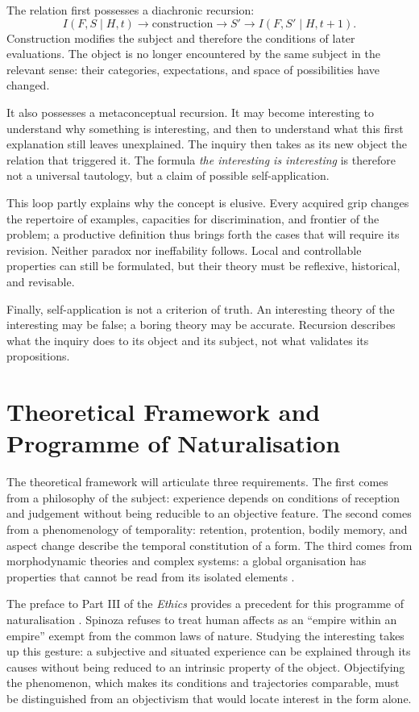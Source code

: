 \documentclass[11pt,a4paper]{article}
\begin{document}
The relation first possesses a diachronic recursion:
\[
  I(F,S\mid H,t)\longrightarrow
  \text{construction}\longrightarrow S'
  \longrightarrow I(F,S'\mid H,t+1).
\]
Construction modifies the subject and therefore the conditions of later
evaluations. The object is no longer encountered by the same subject in the
relevant sense: their categories, expectations, and space of possibilities
have changed.

It also possesses a metaconceptual recursion. It may become interesting to
understand why something is interesting, and then to understand what this first
explanation still leaves unexplained. The inquiry then takes as its new object
the relation that triggered it. The formula \emph{the interesting is
interesting} is therefore not a universal tautology, but a claim of possible
self-application.

This loop partly explains why the concept is elusive. Every acquired grip
changes the repertoire of examples, capacities for discrimination, and frontier
of the problem; a productive definition thus brings forth the cases that will
require its revision. Neither paradox nor ineffability follows. Local and
controllable properties can still be formulated, but their theory must be
reflexive, historical, and revisable.

Finally, self-application is not a criterion of truth. An interesting theory of
the interesting may be false; a boring theory may be accurate. Recursion
describes what the inquiry does to its object and its subject, not what validates
its propositions.

\section{Theoretical Framework and Programme of Naturalisation}

The theoretical framework will articulate three requirements. The first comes
from a philosophy of the subject: experience depends on conditions of reception
and judgement without being reducible to an objective feature. The second comes
from a phenomenology of temporality: retention, protention, bodily memory, and
aspect change describe the temporal constitution of a form. The third comes
from morphodynamic theories and complex systems: a global organisation has
properties that cannot be read from its isolated elements
\parencite{petitot1993phenomenologie,petitot2002naturaliser}.

The preface to Part III of the \emph{Ethics} provides a precedent for this
programme of naturalisation \parencite{spinoza1966ethique}. Spinoza refuses to
treat human affects as an ``empire within an empire'' exempt from the common
laws of nature. Studying the interesting takes up this gesture: a subjective
and situated experience can be explained through its causes without being
reduced to an intrinsic property of the object. Objectifying the phenomenon,
which makes its conditions and trajectories comparable, must be distinguished
from an objectivism that would locate interest in the form alone.
\end{document}
